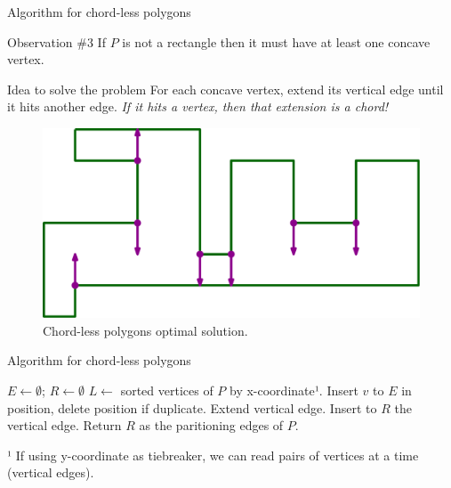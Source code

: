 \documentclass{beamer}
\begin{document}
\begin{frame}[t]{Algorithm for chord-less polygons}	
	\begin{block}{Observation \#3}
	If $P$ is not a rectangle then it must have at least one concave vertex.
	\end{block}  

	\begin{block}{Idea to solve the problem}
	For each concave vertex, extend its vertical edge until it hits another edge.
	\textit{If it hits a vertex, then that extension is a chord!}
	\end{block}  
\begin{figure}

\centering
  \includegraphics[width=.5\textwidth]{"./launchrays.png"}
  \caption{Chord-less polygons optimal solution.}
     \label{fig:question}
\end{figure}

\end{frame}

\begin{frame}[t]{Algorithm for chord-less polygons}	

  \begin{algorithm}[H] %
    \caption{Chord-less MNC in $O(n \log n)$}
    \begin{algorithmic}
      \State $E \leftarrow \emptyset$; $R \leftarrow \emptyset$
        \State $L \leftarrow $ sorted vertices of $P$ by x-coordinate¹.
        \State Insert $v$ to $E$ in position, delete position if duplicate.
        	  \State Extend vertical edge.
          \State Insert to $R$ the vertical edge.
          \EndIf
        \EndFor
        \State Return $R$ as the paritioning edges of $P$.
      \EndProcedure
    \end{algorithmic}
  \end{algorithm}	
	¹ If using y-coordinate as tiebreaker, we can read pairs of vertices at a time (vertical edges). 

\end{frame}
\end{document}
